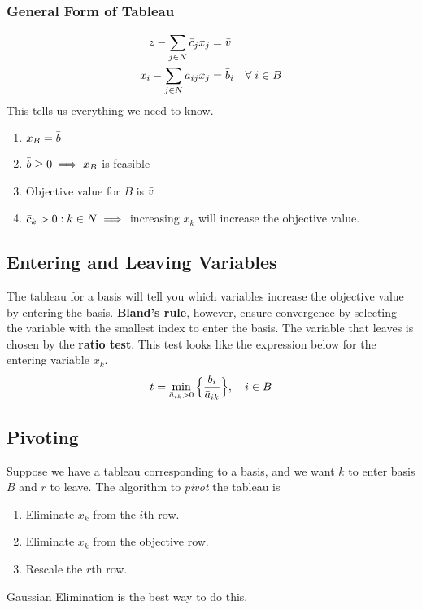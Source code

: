 \subsubsection{General Form of Tableau}
\begin{align}
    z - \sum_{j\in N} \Bar{c}_j x_j & = \Bar{v} \\
    x_i - \sum_{j\in N} \Bar{a}_{ij} x_j & = \Bar{b}_i \quad \forall\; i\in B
\end{align}
This tells us everything we need to know.
\begin{enumerate}
    \item $x_B = \Bar{b}$
    \item $\Bar{b}\geq 0 \implies x_B$ is feasible
    \item Objective value for $B$ is $\Bar{v}$
    \item $\Bar{c}_k>0 : k\in N \implies$ increasing $x_k$ will increase the objective value.
\end{enumerate}


\subsection{Entering and Leaving Variables}
The tableau for a basis will tell you which variables increase the objective value by entering the basis. \textbf{Bland's rule}, however, ensure convergence by selecting the variable with the smallest index to enter the basis. The variable that leaves is chosen by the \textbf{ratio test}. This test looks like the expression below for the entering variable $x_k$.
\begin{equation}
    t = \min_{\Bar{a}_{ik}>0}
    \Big\{\frac{b_i}{\Bar{a}_{ik}}\Big\}, \quad i \in B
\end{equation}


\subsection{Pivoting}
Suppose we have a tableau corresponding to a basis, and we want $k$ to enter basis $B$ and $r$ to leave. The algorithm to \textit{pivot} the tableau is
\begin{enumerate}
    \item Eliminate $x_k$ from the $i$th row.
    \item Eliminate $x_k$ from the objective row.
    \item Rescale the $r$th row.
\end{enumerate}
Gaussian Elimination is the best way to do this.


